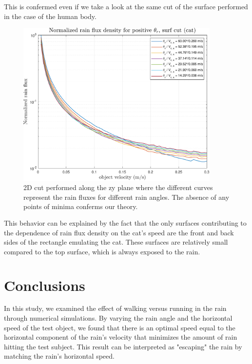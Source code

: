 \documentclass[12pt]{report}
\begin{document}
            \newpage
            This is confermed even if we take a look at the same cut of the surface performed in the case of the human body.
            \begin{figure}[H]
                \centering
                \includegraphics[width=0.9\textwidth]{images/cat/rain_flux_vx_min_cat.pdf}
                \caption{2D cut performed along the zy plane where the different curves represent the rain fluxes for different rain angles. The absence of any points of minima conferms our theory.}
            \end{figure}
            \vspace{-30pt}
            This behavior can be explained by the fact that the only surfaces contributing to the dependence of rain flux density on the cat's speed are the front and back sides of the rectangle emulating the cat. These surfaces are relatively small compared to the top surface, which is always exposed to the rain.

            \newpage
        \section{Conclusions}
            In this study, we examined the effect of walking versus running in the rain through numerical simulations. By varying the rain angle and the horizontal speed of the test object, we found that there is an optimal speed equal to the horizontal component of the rain's velocity that minimizes the amount of rain hitting the test subject. This result can be interpreted as "escaping" the rain by matching the rain's horizontal speed.
\end{document}
